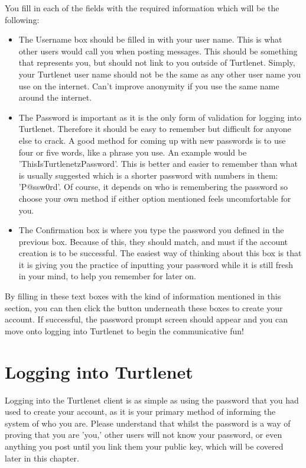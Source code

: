 You fill in each of the fields with the required information which will be the
following:
\begin{itemize}
\item The Username box should be filled in with your user name.  This is what
      other users would call you when posting messages.  This should be 
      something that represents you, but should not link to you outside of
      Turtlenet.  Simply, your Turtlenet user name should not be the same as
      any other user name you use on the internet.  Can't improve anonymity if
      you use the same name around the internet.
\item The Password is important as it is the only form of validation for logging
      into Turtlenet.  Therefore it should be easy to remember but difficult for
      anyone else to crack.  A good method for coming up with new passwords is
      to use four or five words, like a phrase you use.  An example would be
      'ThisIsTurtlenetzPassword'.  This is better and easier to remember than
      what is usually suggested which is a shorter password with numbers in
      them: 'P@ssw0rd'.  Of course, it depends on who is remembering the
      password so choose your own method if either option mentioned feels
      uncomfortable for you.
\item The Confirmation box is where you type the password you defined in the
      previous box.  Because of this, they should match, and must if the account
      creation is to be successful.  The easiest way of thinking about this box
      is that it is giving you the practice of inputting your password while it
      is still fresh in your mind, to help you remember for later on.
\end{itemize}

By filling in these text boxes with the kind of information mentioned in this
section, you can then click the button underneath these boxes to create your
account.  If successful, the password prompt screen should appear and you can
move onto logging into Turtlenet to begin the communicative fun!

\pagebreak
\section{Logging into Turtlenet}
Logging into the Turtlenet client is as simple as using the password that you
had used to create your account, as it is your primary method of informing the
system of who you are.  Please understand that whilst the password is a way of
proving that you are 'you,' other users will not know your password, or even
anything you post until you link them your public key, which will be covered
later in this chapter.

